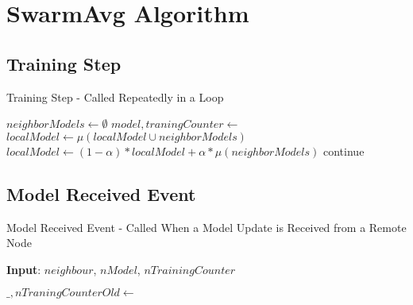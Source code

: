 \appendix

\chapter{SwarmAvg Algorithm} \label{slalgo}
\section{Training Step} \label{slalgo:ul}
\begin{algorithm}[H]
	\caption{Training Step - Called Repeatedly in a Loop}
	\begin{algorithmic}[1]
		\State {}
		\State {}
		\EndFor
		
		\State $neighborModels \gets \emptyset$
		\State $model, traningCounter \gets$ 
		\State {}
		\EndIf
		\EndFor
		\State $localModel \gets \mu(localModel \cup neighborModels)$
		\State $localModel \gets (1 - \alpha) * localModel + \alpha * \mu(neighborModels)$
		\EndIf
		\Else
		\State continue
		\EndIf
		\State {}
		\EndFor
	\end{algorithmic}
\end{algorithm}

\section{Model Received Event} \label{slalgo:mre}
\begin{algorithm}[H]
	\caption{Model Received Event - Called When a Model Update is Received from a Remote Node}
	\textbf{Input}: $neighbour$, $nModel$, $nTrainingCounter$
	\newline
	\begin{algorithmic}[1]
			\State $\_, nTraningCounterOld \gets$ 
				\State {}
			\EndIf
		\Else
			\State {}
		\EndIf
	\end{algorithmic}
\end{algorithm}


